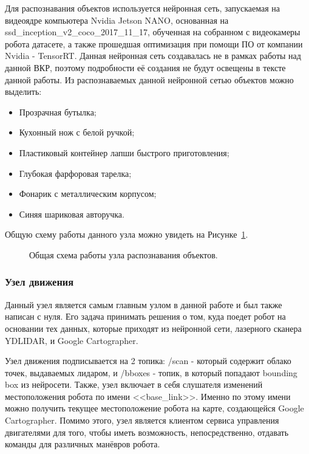 Для распознавания объектов используется нейронная сеть, запускаемая на видеоядре компьютера Nvidia Jetson NANO, основанная на ssd\_inception\_v2\_coco\_2017\_11\_17, обученная на собранном с видеокамеры робота датасете, а также прошедшая оптимизация при помощи ПО от компании Nvidia - TensorRT. Данная нейронная сеть создавалась не в рамках работы над данной ВКР, поэтому подробности её создания не будут освещены в тексте данной работы. Из распознаваемых данной нейронной сетью объектов можно выделить:

\begin{itemize}
\item Прозрачная бутылка;
\item Кухонный нож с белой ручкой;
\item Пластиковый контейнер лапши быстрого приготовления;
\item Глубокая фарфоровая тарелка;
\item Фонарик с металлическим корпусом;
\item Синяя шариковая авторучка.

\end{itemize} 

Общую схему работы данного узла можно увидеть на Рисунке~\ref{fig:node-inference}.

\begin{figure}[ht]
  \caption{Общая схема работы узла распознавания объектов.}\label{fig:node-inference}
\end{figure}

\subsubsection{Узел движения}
Данный узел является самым главным узлом в данной работе и был также написан с нуля. Его задача принимать решения о том, куда поедет робот на основании тех данных, которые приходят из нейронной сети, лазерного сканера YDLIDAR, и Google Cartographer.

Узел движения подписывается на 2 топика: /scan - который содержит облако точек, выдаваемых лидаром, и /bboxes - топик, в который попадают bounding box из нейросети. Также, узел включает в себя слушателя изменений местоположения робота по имени <<base\_link>>. Именно по этому имени можно получить текущее местоположение робота на карте, создающейся Google Cartographer. Помимо этого, узел является клиентом сервиса управления двигателями для того, чтобы иметь возможность, непосредственно, отдавать команды для различных манёвров робота.

